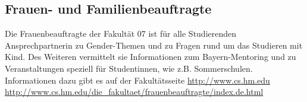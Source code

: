 \subsection{Frauen- und Familienbeauftragte}
Die Frauenbeauftragte der Fakultät 07 ist für alle Studierenden 
Ansprechpartnerin zu Gender-Themen und zu Fragen rund um das 
Studieren mit Kind. Des Weiteren vermittelt sie Informationen zum 
Bayern-Mentoring und zu Veranstaltungen speziell für Studentinnen, 
wie z.B. Sommerschulen. Informationen dazu gibt es auf der 
Fakultätsseite\doublebreak
\url{http://www.cs.hm.edu} \arrow {} \arrow {} \arrow {}\doublebreak
\url{http://www.cs.hm.edu/die_fakultaet/frauenbeauftragte/index.de.html}